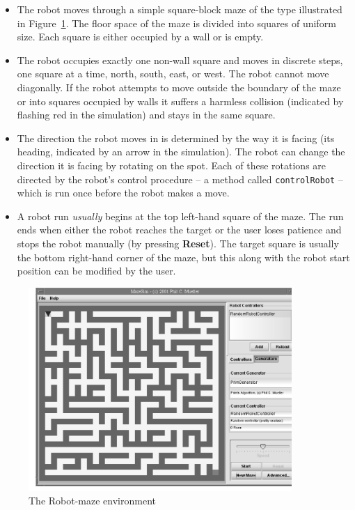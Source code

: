 \begin{itemize}

\item The robot moves through a simple square-block maze of the type
  illustrated in Figure~\ref{maze}.  The floor space of the maze is divided
  into squares of uniform size.  Each square is either occupied by a
  wall or is empty.

\item The robot occupies exactly one non-wall square and moves in
  discrete steps, one square at a time, north, south, east, or west.
  The robot cannot move diagonally.  If the robot attempts to move
  outside the boundary of the maze or into squares occupied by walls it
  suffers a harmless collision (indicated by flashing red in the
  simulation) and stays in the same square.

\item The direction the robot moves in is determined by the way it 
  is facing (its heading, 
  indicated by an arrow in the simulation).  The robot can change
  the direction it is facing by rotating on the spot.
  Each of these rotations are directed by the robot's control procedure
  -- a method called {\tt controlRobot} -- which is run once before the 
  robot makes a move. 

\item A robot run \emph{usually} begins at the top left-hand
  square of the maze.  The run ends when either the robot reaches the
  target or the user loses patience and stops the robot manually
  (by pressing {\bf Reset}).
  The target square is usually the bottom right-hand corner of the maze,
  but this along with the robot start position can be modified by the 
  user. 

\end{itemize}

\begin{figure}
\centering
\includegraphics[width=10cm]{maze.pdf}
\caption{The Robot-maze environment\label{maze}}
\end{figure}

